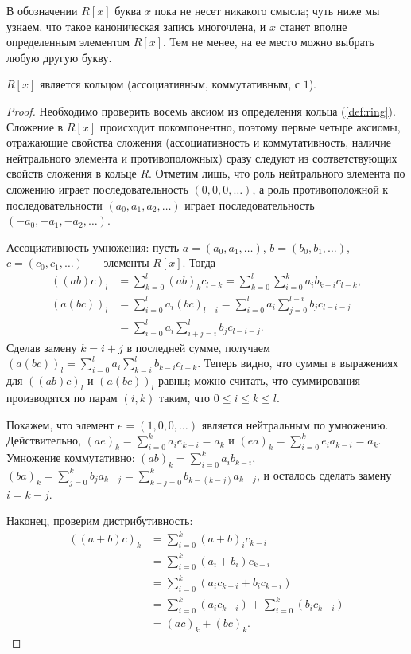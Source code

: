 \begin{remark}
В обозначении $R[x]$ буква $x$ пока не несет никакого смысла; чуть
ниже мы узнаем, что такое каноническая запись многочлена, и $x$ станет
вполне определенным элементом $R[x]$. Тем не менее, на ее место можно
выбрать любую другую букву.
\end{remark}

\begin{theorem}
$R[x]$ является кольцом (ассоциативным, коммутативным, с $1$).
\end{theorem}
\begin{proof}
Необходимо проверить восемь аксиом из определения кольца
(\ref{def:ring}). Сложение в $R[x]$ происходит
покомпонентно, поэтому первые четыре аксиомы, отражающие свойства
сложения (ассоциативность и
коммутативность, наличие нейтрального элемента и
противоположных) сразу следуют из соответствующих свойств сложения в
кольце $R$. Отметим лишь, что роль нейтрального элемента по сложению
играет последовательность $(0,0,0,\dots)$, а роль противоположной к
последовательности $(a_0,a_1,a_2,\dots)$ играет последовательность
$(-a_0,-a_1,-a_2,\dots)$.

Ассоциативность умножения: пусть $a=(a_0,a_1,\dots)$,
$b=(b_0,b_1,\dots)$, $c=(c_0,c_1,\dots)$~--- элементы $R[x]$. Тогда
\begin{align*}
((ab)c)_l&=\sum_{k=0}^l(ab)_kc_{l-k}=\sum_{k=0}^l\sum_{i=0}^ka_ib_{k-i}c_{l-k},\\
(a(bc))_l&=\sum_{i=0}^la_i(bc)_{l-i}=\sum_{i=0}^la_i\sum_{j=0}^{l-i}b_jc_{l-i-j}\\
&=\sum_{i=0}^la_i\sum_{i+j=i}^lb_jc_{l-i-j}.
\end{align*}
Сделав замену $k=i+j$ в последней сумме, получаем
$(a(bc))_l=\sum_{i=0}^l a_i\sum_{k=i}^lb_{k-i}c_{l-k}$. Теперь видно,
что суммы в выражениях для $((ab)c)_l$ и $(a(bc))_l$ равны; можно
считать, что суммирования производятся по парам $(i,k)$ таким, что
$0\leq i\leq k\leq l$.

Покажем, что элемент $e=(1,0,0,\dots)$ является нейтральным по
умножению. Действительно, $(ae)_k=\sum_{i=0}^ka_ie_{k-i}=a_k$ и
$(ea)_k=\sum_{i=0}^ke_ia_{k-i}=a_k$. Умножение коммутативно:
$(ab)_k=\sum_{i=0}^ka_ib_{k-i}$,
$(ba)_k=\sum_{j=0}^kb_ja_{k-j}=\sum_{k-j=0}^{k}b_{k-(k-j)}a_{k-j}$, и
осталось сделать замену $i=k-j$.

Наконец, проверим дистрибутивность:
\begin{align*}
((a+b)c)_k&=\sum_{i=0}^k(a+b)_ic_{k-i}\\
&=\sum_{i=0}^k(a_i+b_i)c_{k-i}\\
&=\sum_{i=0}^k(a_ic_{k-i}+b_ic_{k-i})\\
&=\sum_{i=0}^k(a_ic_{k-i})+\sum_{i=0}^k(b_ic_{k-i})\\
&=(ac)_k+(bc)_k.
\end{align*}
\end{proof}

